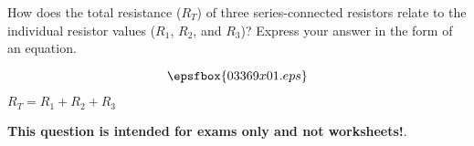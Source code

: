 

How does the total resistance ($R_T$) of three series-connected resistors relate to the individual resistor values ($R_1$, $R_2$, and $R_3$)?  Express your answer in the form of an equation.

$$\epsfbox{03369x01.eps}$$







$R_T = R_1 + R_2 + R_3$







{\bf This question is intended for exams only and not worksheets!}.



